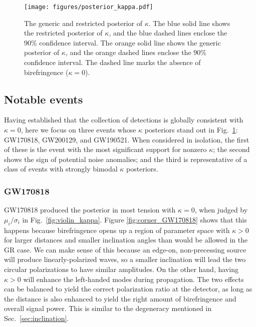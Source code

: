 \documentclass[aps,prd,twocolumn,superscriptaddress,preprintnumbers,floatfix,nofootinbib]{revtex4-2}
\begin{document}
\begin{figure}
    \texttt{[image: figures/posterior\_kappa.pdf]}
    \caption{
        The generic and restricted posterior of $\kappa$.
        The blue solid line shows the restricted posterior of $\kappa$, and the blue dashed lines enclose the $90\%$ confidence interval.
        The orange solid line shows the generic posterior of $\kappa$, and the orange dashed lines enclose the $90\%$ confidence interval.
        The dashed line marks the absence of birefringence ($\kappa=0$).
    }
    \label{fig:posterior_kappa}
\end{figure}

\subsection{Notable events}

Having established that the collection of detections is globally consistent with $\kappa=0$, here we focus on three events whose $\kappa$ posteriors stand out in Fig.~\ref{fig:posterior_kappa}: GW170818, GW200129, and GW190521.
When considered in isolation, the first of these is the event with the most significant support for nonzero $\kappa$; the second shows the sign of potential noise anomalies; and the third is representative of a class of events with strongly bimodal $\kappa$ posteriors.

\subsubsection{GW170818}
GW170818 produced the posterior in most tension with $\kappa=0$, when judged by $\mu_i/\sigma_i$ in Fig.~\ref{fig:violin_kappa}.
Figure \ref{fig:corner_GW170818} shows that this happens because birefringence opens up a region of parameter space with $\kappa>0$ for larger distances and smaller inclination angles than would be allowed in the GR case.
We can make sense of this because an edge-on, non-precessing source will produce linearly-polarized waves, so a smaller inclination will lead the two circular polarizations to have similar amplitudes.
On the other hand, having $\kappa > 0$ will enhance the left-handed modes during propagation.
The two effects can be balanced to yield the correct polarization ratio at the detector, as long as the distance is also enhanced to yield the right amount of birefringence and overall signal power.
This is similar to the degeneracy mentioned in Sec.~\ref{sec:inclination}.
\end{document}

